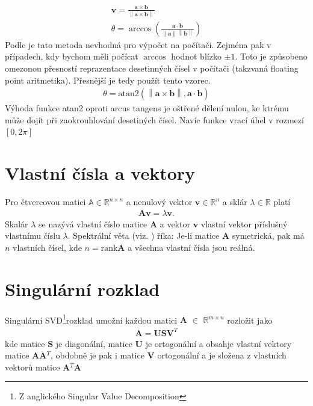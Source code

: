 \documentclass[twoside]{ctuthesis}
\newcommand{\spc}[2]{$\mathbb{#1}^{#2}$}
\newcommand{\minsp}[3]{$\mathbb{#1} \in \mathbb{#2}^{#3}$}
\newcommand{\tl}[1]{$\mathbf{#1}$}
\newcommand{\norm}[1]{\left\lVert#1\right\rVert}
\begin{document}
\begin{align}
    \mathbf{v} = \frac{\mathbf{a} \times \mathbf{b}}{\norm{\mathbf{a}\times \mathbf{b}}}\\
    \theta = \arccos \left( \frac{\mathbf{a} \cdot \mathbf{b}}{\norm{\mathbf{a}}\norm{\mathbf{b}}} \right)
\end{align}
Podle \cite{james_w_angle_2014} je tato metoda nevhodná pro výpočet na počítači. Zejména pak v případech, kdy bychom měli počícat $\arccos$ hodnot blízko $\pm 1$. Toto je způsobeno omezonou přesností reprazentace desetinných čísel v počítači (takzvaná floating point aritmetika). Přesnější je tedy použít tento vzorec.
\begin{align}
    \theta = \text{atan2}\left( \norm{\mathbf{a} \times \mathbf{b}}, \mathbf{a}\cdot \mathbf{b} \right) 
\end{align}
Výhoda funkce atan2 oproti arcus tangens je oštřené dělení nulou, ke ktrému může dojít při zaokrouhlování desetiných čísel. Navíc funkce vrací úhel v rozmezí $\left[ 0, 2\pi \right]$

\section{Vlastní čísla a vektory}
Pro čtvercovou matici \minsp{A}{R}{n\times n} a nenulový vektor \tl{v}\minsp{}{R}{n} a sklár $\lambda \in \mathbb{R}$ platí
\begin{align}
    \mathbf{Av} = \lambda \mathbf{v}.
\end{align}
Skalár $\lambda$ se nazývá vlastní číslo matice \tl{A} a vektor \tl{v} vlastní vektor příslušný vlastnímu číslu $\lambda$.
Spektrální věta (viz. \cite{Werner2020}) říka: Je-li matice \tl{A} symetrická, pak má $n$ vlastních čísel, kde $n = \text{rank}\mathbf{A}$ a všechna vlastní čísla jsou reálná.

\section{Singulární rozklad}
Singulární SVD\footnote{Z anglického Singular Value Decomposition}rozklad umožní každou matici \tl{A} $\in$ \spc{R}{m \times n} rozložit jako
\begin{align}
    \mathbf{A} = \mathbf{USV}^T
\end{align}
kde matice \tl{S} je diagonální, matice \tl{U} je ortogonální a obsahje vlastní vektory matice \tl{AA}$^T$, obdobně je pak i matice \tl{V} ortogonální a je složena z vlastních vektorů matice \tl{A}$^T$\tl{A}
\end{document}

